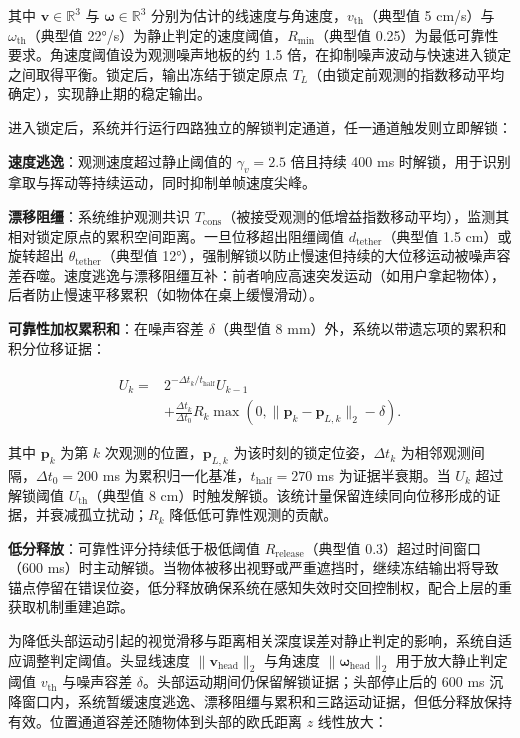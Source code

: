 \documentclass[9pt,twocolumn,letterpaper]{extarticle}
\begin{document}
其中 $\mathbf{v} \in \mathbb{R}^3$ 与 $\mathbf{\omega} \in \mathbb{R}^3$ 分别为估计的线速度与角速度，$v_{\mathrm{th}}$（典型值 5 cm/s）与 $\omega_{\mathrm{th}}$（典型值 22°/s）为静止判定的速度阈值，$R_{\mathrm{min}}$（典型值 0.25）为最低可靠性要求。角速度阈值设为观测噪声地板的约 1.5 倍，在抑制噪声波动与快速进入锁定之间取得平衡。锁定后，输出冻结于锁定原点 $T_L$（由锁定前观测的指数移动平均确定），实现静止期的稳定输出。

进入锁定后，系统并行运行四路独立的解锁判定通道，任一通道触发则立即解锁：

\textbf{速度逃逸}：观测速度超过静止阈值的 $\gamma_v = 2.5$ 倍且持续 400 ms 时解锁，用于识别拿取与挥动等持续运动，同时抑制单帧速度尖峰。

\textbf{漂移阻缰}：系统维护观测共识 $T_{\mathrm{cons}}$（被接受观测的低增益指数移动平均），监测其相对锁定原点的累积空间距离。一旦位移超出阻缰阈值 $d_{\mathrm{tether}}$（典型值 1.5 cm）或旋转超出 $\theta_{\mathrm{tether}}$（典型值 12°），强制解锁以防止慢速但持续的大位移运动被噪声容差吞噬。速度逃逸与漂移阻缰互补：前者响应高速突发运动（如用户拿起物体），后者防止慢速平移累积（如物体在桌上缓慢滑动）。

\textbf{可靠性加权累积和}：在噪声容差 $\delta$（典型值 8 mm）外，系统以带遗忘项的累积和积分位移证据：

\begin{equation}
\begin{aligned}
U_k ={}& 2^{-\Delta t_k/t_{\mathrm{half}}}U_{k-1} \\
&+ \frac{\Delta t_k}{\Delta t_0}R_k
\max\!\left(0,\lVert \mathbf{p}_k-\mathbf{p}_{L,k}\rVert_2-\delta\right).
\end{aligned}
\label{eq:cusum}
\end{equation}


其中 $\mathbf{p}_k$ 为第 $k$ 次观测的位置，$\mathbf{p}_{L,k}$ 为该时刻的锁定位姿，$\Delta t_k$ 为相邻观测间隔，$\Delta t_0 = 200$ ms 为累积归一化基准，$t_{\mathrm{half}} = 270$ ms 为证据半衰期。当 $U_k$ 超过解锁阈值 $U_{\mathrm{th}}$（典型值 8 cm）时触发解锁。该统计量保留连续同向位移形成的证据，并衰减孤立扰动；$R_k$ 降低低可靠性观测的贡献。

\textbf{低分释放}：可靠性评分持续低于极低阈值 $R_{\mathrm{release}}$（典型值 0.3）超过时间窗口（600 ms）时主动解锁。当物体被移出视野或严重遮挡时，继续冻结输出将导致锚点停留在错误位姿，低分释放确保系统在感知失效时交回控制权，配合上层的重获取机制重建追踪。

为降低头部运动引起的视觉滑移与距离相关深度误差对静止判定的影响，系统自适应调整判定阈值。头显线速度 $\lVert \mathbf{v}_{\mathrm{head}} \rVert_2$ 与角速度 $\lVert \mathbf{\omega}_{\mathrm{head}} \rVert_2$ 用于放大静止判定阈值 $v_{\mathrm{th}}$ 与噪声容差 $\delta$。头部运动期间仍保留解锁证据；头部停止后的 600 ms 沉降窗口内，系统暂缓速度逃逸、漂移阻缰与累积和三路运动证据，但低分释放保持有效。位置通道容差还随物体到头部的欧氏距离 $z$ 线性放大：
\end{document}
